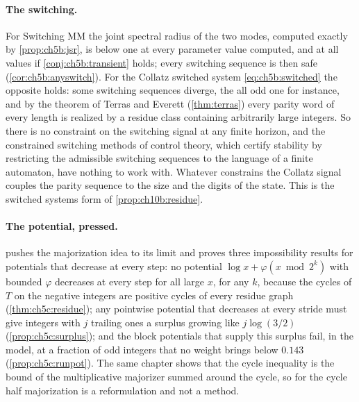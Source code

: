 \paragraph{The switching.} For Switching MM the joint spectral radius of the two modes, computed exactly by \cref{prop:ch5b:jsr}, is below one at every parameter value computed, and at all values if \cref{conj:ch5b:transient} holds; every switching sequence is then safe (\cref{cor:ch5b:anyswitch}).
For the Collatz switched system
\eqref{eq:ch5b:switched} the opposite holds: some switching sequences diverge, the all odd one for instance, and
by the theorem of Terras and Everett (\cref{thm:terras}) every parity word of every length is realized by a residue
class containing arbitrarily large integers. So there is no constraint on the
switching signal at any finite horizon, and the constrained switching methods
of control theory, which certify stability by restricting the admissible
switching sequences to the language of a finite automaton, have nothing to work
with. Whatever constrains the Collatz signal couples the parity sequence to the
size and the digits of the state. This is the switched systems form of
\cref{prop:ch10b:residue}.

\paragraph{The potential, pressed.}  pushes the
majorization idea to its limit and proves three impossibility results for potentials that decrease at every step: no potential $\log x+\varphi(x\bmod2^k)$ with bounded $\varphi$ decreases at every step for all large $x$, for any $k$, because the cycles of
$T$ on the negative integers are positive cycles of every residue graph
(\cref{thm:ch5c:residue}); any pointwise potential that decreases at every stride must give integers with $j$
trailing ones a surplus growing like $j\log(3/2)$ (\cref{prop:ch5c:surplus});
and the block potentials that supply this surplus fail, in the model, at a fraction of odd
integers that no weight brings below $0.143$ (\cref{prop:ch5c:runpot}). The
same chapter shows that the cycle inequality is the bound of the multiplicative
majorizer summed around the cycle, so for the cycle half majorization is a
reformulation and not a method.

